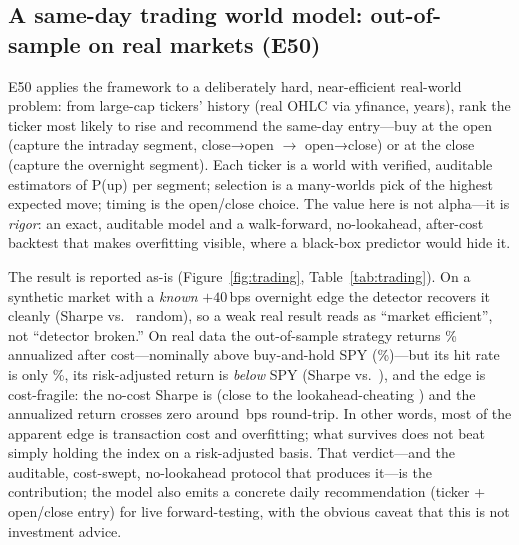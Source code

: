 \documentclass[11pt]{article}
\begin{document}
\begin{table}[htb]
\centering
\caption{\textbf{E47 atomic-clock validation.} The verified relativistic model
vs.\ real/documented measurements. GPS is computed from first principles;
Hafele--Keating uses flight-averaged parameters.}
\label{tab:relativity}

\end{table}

\subsection{A same-day trading world model: out-of-sample on real markets (E50)}\label{sec:trading}
E50 applies the framework to a deliberately hard, near-efficient real-world
problem: from \TradeUniverse{} large-cap tickers' history (real OHLC via
yfinance, \TradeYears{} years), rank the ticker most likely to rise and recommend
the same-day entry---buy at the open (capture the intraday segment, close→open
$\to$ open→close) or at the close (capture the overnight segment). Each ticker is
a world with verified, auditable estimators of P(up) per segment; selection is a
many-worlds pick of the highest expected move; timing is the open/close choice.
The value here is not alpha---it is \emph{rigor}: an exact, auditable model and a
walk-forward, no-lookahead, after-cost backtest that makes overfitting
visible, where a black-box predictor would hide it.

The result is reported as-is (Figure~\ref{fig:trading}, Table~\ref{tab:trading}).
On a synthetic market with a \emph{known} $+40$\,bps overnight edge the detector
recovers it cleanly (Sharpe \TradeSynSharpe{} vs.\ \TradeSynRandom{} random), so a
weak real result reads as ``market efficient'', not ``detector broken.'' On real
data the out-of-sample strategy returns \TradeHonestAnn\% annualized after
cost---nominally above buy-and-hold SPY (\TradeSpyAnn\%)---but its hit rate is
only \TradeHonestHit\%, its risk-adjusted return is \emph{below} SPY (Sharpe
\TradeHonestSharpe{} vs.\ \TradeSpySharpe{}), and the edge is cost-fragile: the
no-cost Sharpe is \TradeNoCostSharpe{} (close to the lookahead-cheating
\TradeLookaheadSharpe{}) and the annualized return crosses zero around
\TradeCostBreakeven\,bps round-trip. In other words, most of the apparent edge is
transaction cost and overfitting; what survives does not beat simply holding the
index on a risk-adjusted basis. That verdict---and the auditable,
cost-swept, no-lookahead protocol that produces it---is the contribution; the
model also emits a concrete daily recommendation (ticker + open/close entry) for
live forward-testing, with the obvious caveat that this is not investment advice.
\end{document}
